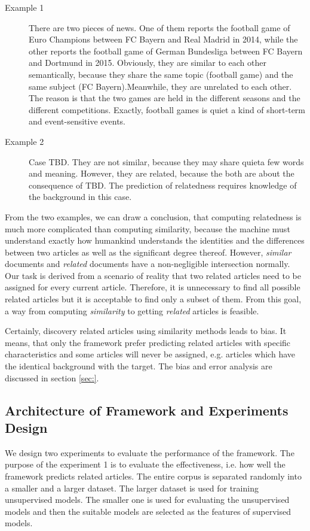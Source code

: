 \begin{description}
\item[Example 1] There are two pieces of news. One of them reports the football game of Euro Champions between FC Bayern and Real Madrid in 2014, while the other reports the football game of German Bundesliga between FC Bayern and Dortmund in 2015. Obviously, they are similar to each other semantically, because they share the same topic (football game) and the same subject (FC Bayern).Meanwhile, they are unrelated to each other. The reason is that the two games are held in the different seasons and the different competitions. Exactly, football games is quiet a kind of short-term and event-sensitive events. 
\item[Example 2] Case TBD. They are not similar, because they may share quieta few words and meaning. However, they are related, because the both are about the consequence of TBD. The prediction of relatedness requires knowledge of the background in this case.
\end{description}

From the two examples, we can draw a conclusion, that computing relatedness is much more complicated than computing similarity, because the machine must understand exactly how humankind understands the identities and the differences between two articles as well as the significant degree thereof. However, \textit{similar} documents and \textit{related} documents have a non-negligible intersection normally. Our task is derived from a scenario of reality that two related articles need to be assigned for every current article. Therefore, it is unnecessary to find all possible related articles but it is acceptable to find only a subset of them. From this goal, a way from computing \textit{similarity} to getting \textit{related} articles is feasible. 

Certainly, discovery related articles using similarity methods leads to bias. It means, that only the framework prefer predicting related articles with specific characteristics and some articles will never be assigned, e.g. articles which have the identical background with the target. The bias and error analysis are discussed in section \ref{sec:}. 

\subsection{Architecture of Framework and Experiments Design}
\label{sec:5.1}
We design two experiments to evaluate the performance of the framework. The purpose of the experiment 1 is to evaluate the effectiveness, i.e. how well the framework predicts related articles. The entire corpus is separated randomly into a smaller and a larger dataset. The larger dataset is used for training unsupervised models. The smaller one is used for evaluating the unsupervised models and then the suitable models are selected as the features of supervised models. 

